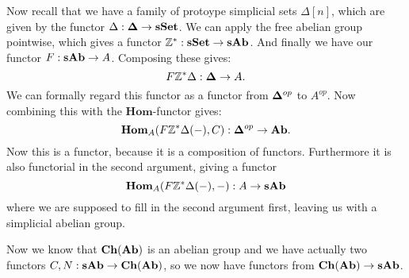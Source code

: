 Now recall that we have a family of protoype simplicial sets $\Delta[n]$, which are given by the functor $\Delta : \mathbf{\Delta} \to \mathbf{sSet}$. We can apply the free abelian group pointwise, which gives a functor $\mathbb{Z}^{\ast} : \mathbf{sSet} \to \mathbf{sAb}$. And finally we have our functor $F : \mathbf{sAb} \to A$. Composing these gives:
$$ F \mathbb{Z}^{\ast} \Delta : \mathbf{\Delta} \to A. $$
We can formally regard this functor as a functor from $\mathbf{\Delta}^{op}$ to $A^{op}$. Now combining this with the $\mathbf{Hom}$-functor gives:
$$ \mathbf{Hom}_{A}(F \mathbb{Z}^{\ast} \Delta (-), C) : \mathbf{\Delta}^{op} \to \mathbf{Ab}. $$
Now this is a functor, because it is a composition of functors. Furthermore it is also functorial in the second argument, giving a functor
$$ \mathbf{Hom}_{A}(F \mathbb{Z}^{\ast} \Delta (-), -) : A \to \mathbf{sAb} $$
where we are supposed to fill in the second argument first, leaving us with a simplicial abelian group.

Now we know that $\mathbf{Ch}(\mathbf{Ab})$ is an abelian group and we have actually two functors $C, N : \mathbf{sAb} \to \mathbf{Ch}(\mathbf{Ab})$, so we now have functors from $\mathbf{Ch}(\mathbf{Ab}) \to \mathbf{sAb}$.
